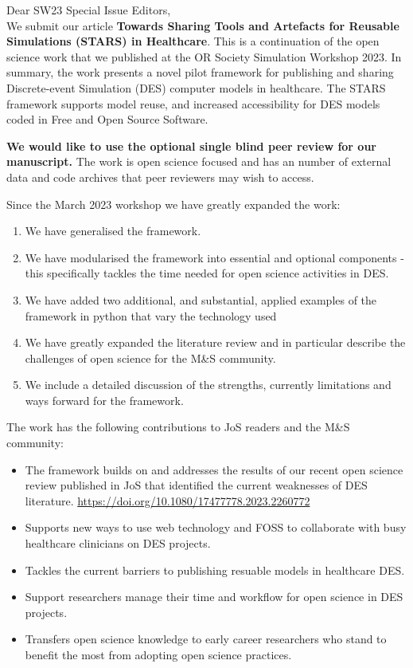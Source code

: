 \documentclass{article}
\begin{document}
\noindent Dear SW23 Special Issue Editors,
\\

We submit our article \textbf{Towards Sharing Tools and Artefacts for Reusable Simulations (STARS) in Healthcare}.  This is a continuation of the open science work that we published at the OR Society Simulation Workshop 2023.  In summary, the work presents a novel pilot framework for publishing and sharing Discrete-event Simulation (DES) computer models in healthcare. The STARS framework supports model reuse, and increased accessibility for DES models coded in Free and Open Source Software.

\textbf{We would like to use the optional single blind peer review for our manuscript.} The work is open science focused and has an number of external data and code archives that peer reviewers may wish to access. 

Since the March 2023 workshop we have greatly expanded the work:

\begin{enumerate}
    \item We have generalised the framework.
    \item We have modularised the framework into essential and optional components - this specifically tackles the time needed for open science activities in DES.
    \item We have added two additional, and substantial, applied examples of the framework in python that vary the technology used 
    \item We have greatly expanded the literature review and in particular describe the challenges of open science for the M\&S community.
    \item We include a detailed discussion of the strengths, currently limitations and ways forward for the framework.
\end{enumerate}

The work has the following contributions to JoS readers and the M\&S community:

\begin{itemize}
    \item The framework builds on and addresses the results of our recent open science review published in JoS that identified the current weaknesses of DES literature. \url{https://doi.org/10.1080/17477778.2023.2260772}
    \item Supports new ways to use web technology and FOSS to collaborate with busy healthcare clinicians on DES projects.
    \item Tackles the current barriers to publishing resuable models in healthcare DES.
    \item Support researchers manage their time and workflow for open science in DES projects.
    \item Transfers open science knowledge to early career researchers who stand to benefit the most from adopting open science practices.
\end{itemize}
\end{document}
